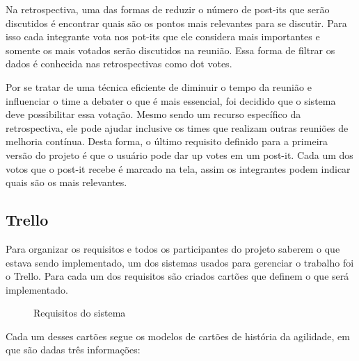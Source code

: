 Na retrospectiva, uma das formas de reduzir o número de post-its que serão discutidos é encontrar quais são os pontos mais relevantes para se discutir. Para isso cada integrante vota nos pot-its que ele considera mais importantes e somente os mais votados serão discutidos na reunião. Essa forma de filtrar os dados é conhecida nas retrospectivas como dot votes.

Por se tratar de uma técnica eficiente de diminuir o tempo da reunião e influenciar o time a debater o que é mais essencial, foi decidido que o sistema deve possibilitar essa votação. Mesmo sendo um recurso específico da retrospectiva, ele pode ajudar inclusive os times que realizam outras reuniões de melhoria contínua. Desta forma, o último requisito definido para a primeira versão do projeto é que o usuário pode dar up votes em um post-it. Cada um dos votos que o post-it recebe é marcado na tela, assim os integrantes podem indicar quais são os mais relevantes.

\subsection{Trello}

Para organizar os requisitos e todos os participantes do projeto saberem o que estava sendo implementado, um dos sistemas usados para gerenciar o trabalho foi o Trello. Para cada um dos requisitos são criados cartões que definem o que será implementado.

\begin{figure}[H]
  \hspace*{-4em}
  \caption{Requisitos do sistema}\label{figura:requisitos}
\end{figure}

Cada um desses cartões segue os modelos de cartões de história da agilidade, em que são dadas três informações:

